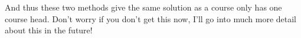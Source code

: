 \documentclass[preview]{standalone}
\begin{document}
\begin{flushleft}
And thus these two methods give the same solution as a course only has one course head. Don't worry if you don't get this now, I'll go into much more detail about this in the future!
\end{flushleft}
\end{document}
